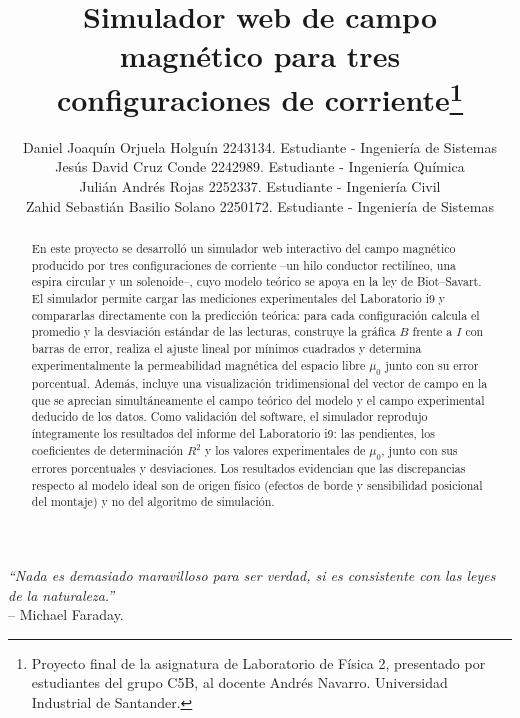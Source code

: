 \documentclass{article}
\begin{document}
\title{\textbf{Simulador web de campo magnético para tres configuraciones de corriente}\thanks{Proyecto final de la asignatura de Laboratorio de Física 2, presentado por estudiantes del grupo C5B, al docente Andrés Navarro. Universidad Industrial de Santander.}}

\author{Daniel Joaquín Orjuela Holguín 2243134. Estudiante - Ingeniería de Sistemas
\\Jesús David Cruz Conde 2242989. Estudiante - Ingeniería Química
\\Julián Andrés Rojas 2252337. Estudiante - Ingeniería Civil
\\Zahid Sebastián Basilio Solano 2250172. Estudiante - Ingeniería de Sistemas}
\date{}
\maketitle
\thispagestyle{fancy}

\begin{flushright}
\textit{``Nada es demasiado maravilloso para ser verdad, si es consistente con las leyes de la naturaleza.''} \\-- Michael Faraday.
\end{flushright}

\begin{abstract}
    \noindent
    En este proyecto se desarrolló un simulador web interactivo del campo magnético producido por tres configuraciones de corriente --un hilo conductor rectilíneo, una espira circular y un solenoide--, cuyo modelo teórico se apoya en la ley de Biot--Savart. El simulador permite cargar las mediciones experimentales del Laboratorio i9 y compararlas directamente con la predicción teórica: para cada configuración calcula el promedio y la desviación estándar de las lecturas, construye la gráfica $B$ frente a $I$ con barras de error, realiza el ajuste lineal por mínimos cuadrados y determina experimentalmente la permeabilidad magnética del espacio libre $\mu_0$ junto con su error porcentual. Además, incluye una visualización tridimensional del vector de campo en la que se aprecian simultáneamente el campo teórico del modelo y el campo experimental deducido de los datos. Como validación del software, el simulador reprodujo íntegramente los resultados del informe del Laboratorio i9: las pendientes, los coeficientes de determinación $R^2$ y los valores experimentales de $\mu_0$, junto con sus errores porcentuales y desviaciones. Los resultados evidencian que las discrepancias respecto al modelo ideal son de origen físico (efectos de borde y sensibilidad posicional del montaje) y no del algoritmo de simulación.
\end{abstract}
\end{document}

